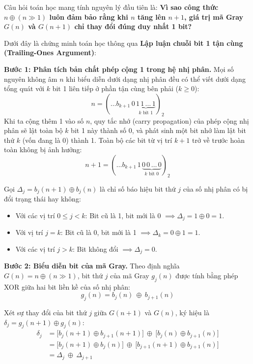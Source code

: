 Câu hỏi toán học mang tính nguyên lý đầu tiên là: \textbf{Vì sao công thức $n \oplus (n \gg 1)$ luôn đảm bảo rằng khi $n$ tăng lên $n+1$, giá trị mã Gray $G(n)$ và $G(n+1)$ chỉ thay đổi đúng duy nhất 1 bit?}

Dưới đây là chứng minh toán học thông qua \textbf{Lập luận chuỗi bit 1 tận cùng (Trailing-Ones Argument)}:

\textbf{Bước 1: Phân tích bản chất phép cộng 1 trong hệ nhị phân.}
Mọi số nguyên không âm $n$ khi biểu diễn dưới dạng nhị phân đều có thể viết dưới dạng tổng quát với $k$ bit 1 liên tiếp ở phần tận cùng bên phải ($k \ge 0$):
\begin{equation}
n = (\dots b_{k+1} \, 0 \, \underbrace{1 \, 1 \, \dots \, 1}_{k \text{ bit 1}})_2
\end{equation}
Khi ta cộng thêm 1 vào số $n$, quy tắc nhớ (carry propagation) của phép cộng nhị phân sẽ lật toàn bộ $k$ bit 1 này thành số 0, và phát sinh một bit nhớ làm lật bit thứ $k$ (vốn đang là 0) thành 1. Toàn bộ các bit từ vị trí $k+1$ trở về trước hoàn toàn không bị ảnh hưởng:
\begin{equation}
n + 1 = (\dots b_{k+1} \, 1 \, \underbrace{0 \, 0 \, \dots \, 0}_{k \text{ bit 0}})_2
\end{equation}

Gọi $\Delta_j = b_j(n+1) \oplus b_j(n)$ là chỉ số báo hiệu bit thứ $j$ của số nhị phân có bị đổi trạng thái hay không:
\begin{itemize}[leftmargin=1.5em, itemsep=2pt]
    \item Với các vị trí $0 \le j < k$: Bit cũ là 1, bit mới là 0 $\implies \Delta_j = 1 \oplus 0 = 1$.
    \item Với vị trí $j = k$: Bit cũ là 0, bit mới là 1 $\implies \Delta_k = 0 \oplus 1 = 1$.
    \item Với các vị trí $j > k$: Bit không đổi $\implies \Delta_j = 0$.
\end{itemize}

\textbf{Bước 2: Biểu diễn bit của mã Gray.}
Theo định nghĩa $G(n) = n \oplus (n \gg 1)$, bit thứ $j$ của mã Gray $g_j(n)$ được tính bằng phép XOR giữa hai bit liền kề của số nhị phân:
\begin{equation}
g_j(n) = b_j(n) \ \oplus \ b_{j+1}(n)
\end{equation}

Xét sự thay đổi của bit thứ $j$ giữa $G(n+1)$ và $G(n)$, ký hiệu là $\delta_j = g_j(n+1) \oplus g_j(n)$:
\begin{align}
\delta_j &= \big[b_j(n+1) \oplus b_{j+1}(n+1)\big] \ \oplus \ \big[b_j(n) \oplus b_{j+1}(n)\big] \nonumber \\
         &= \big[b_j(n+1) \oplus b_j(n)\big] \ \oplus \ \big[b_{j+1}(n+1) \oplus b_{j+1}(n)\big] \nonumber \\
         &= \Delta_j \ \oplus \ \Delta_{j+1}
\end{align}

